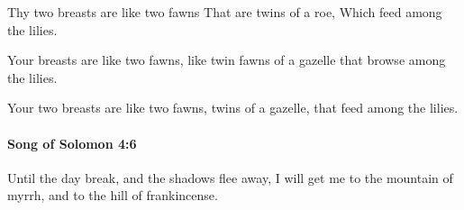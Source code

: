 			\begin{versebox}
					\item[BHS] 
					\item[LXX] 
					\item[ASV] Thy two breasts are like two fawns That are twins of a roe, Which feed among the lilies.
					\item[NIV] Your breasts are like two fawns, like twin fawns of a gazelle that browse among the lilies.
					\item[NRSV] Your two breasts are like two fawns, twins of a gazelle, that feed among the lilies.
			\end{versebox}

		\paragraph{Song of Solomon 4:6} %
			\label{SONGOFSOLOMON-4-6}

			Until the day break, and the shadows flee away, I will get me to the mountain of myrrh, and to the hill of frankincense.

